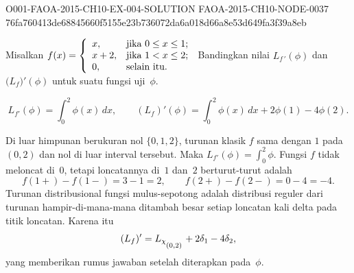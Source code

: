 \begin{o001solution}
  {O001-FAOA-2015-CH10-EX-004-SOLUTION}
  {FAOA-2015-CH10-NODE-0037}
  {76fa760413de68845660f5155e23b736072da6a018d66a8e53d649fa3f39a8eb}
\begin{o001statement}
Misalkan $f(x) = \left\{
                           \begin{array}{ll}
                             x, & \hbox{jika $0 \le x \le 1$;} \\
                             x + 2, & \hbox{jika $1 < x \le 2$;} \\
                             0, & \hbox{selain itu.}
                           \end{array}
                         \right.$ Bandingkan nilai $L_{f\,'}(\phi)$ dan $\bigl(L_f\bigr)'(\phi)$ untuk suatu fungsi uji~$\phi$.
\end{o001statement}
\begin{o001answer}
\[
 L_{f'}(\phi)=\int_0^2\phi(x)\,dx,
 \qquad
 (L_f)'(\phi)=\int_0^2\phi(x)\,dx+2\phi(1)-4\phi(2).
\]
\end{o001answer}
\begin{o001proof}
Di luar himpunan berukuran nol $\{0,1,2\}$, turunan klasik $f$ sama dengan
$1$ pada $(0,2)$ dan nol di luar interval tersebut. Maka
$L_{f'}(\phi)=\int_0^2\phi$. Fungsi $f$ tidak meloncat di~$0$, tetapi
loncatannya di~$1$ dan~$2$ berturut-turut adalah
\[
 f(1+)-f(1-)=3-1=2,
 \qquad
 f(2+)-f(2-)=0-4=-4.
\]
Turunan distribusional fungsi mulus-sepotong adalah distribusi reguler dari
turunan hampir-di-mana-mana ditambah besar setiap loncatan kali delta pada
titik loncatan. Karena itu
\[
 (L_f)'=L_{\chi_{{}_{\scriptstyle{(0,2)}}}}+2\delta_1-4\delta_2,
\]
yang memberikan rumus jawaban setelah diterapkan pada~$\phi$.
\end{o001proof}
\end{o001solution}

